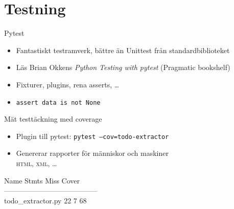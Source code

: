 \section{Testning}

\begin{frame}{Pytest}
  \begin{itemize}
    \item Fantastiskt testramverk, bättre än Unittest från standardbiblioteket
    \item Läs Brian Okkens \emph{Python Testing with pytest} (Pragmatic bookshelf)
    \item Fixturer, plugins, rena asserts, …
    \item \texttt{assert data is not None}
  \end{itemize}
\end{frame}

\begin{frame}{Mät testtäckning med coverage}
  \begin{itemize}
    \item Plugin till pytest: \texttt{pytest --cov=todo-extractor}
    \item Genererar rapporter för människor och maskiner\\
          \textsc{html}, \textsc{xml}, …
  \end{itemize}

  \vfill
  {\small\ttfamily
    Name                Stmts   Miss  Cover\\
    ---------------------------------------\\
    todo\_extractor.py      22      7    68%
  }
\end{frame}
